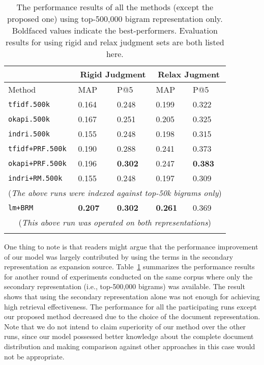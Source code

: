 \begin{table}[ht!]
  \centering
  \begin{tabular}{p{3cm}p{1.5cm}p{1.5cm}p{1.5cm}p{1.5cm}}
    & \multicolumn{2}{c}{Rigid Judgment} & \multicolumn{2}{c}{Relax Jugment} \\
    \hline
    Method & MAP & P@5 & MAP & P@5 \\
    \hline
    {\tt tfidf.500k} & 0.164 & 0.248 & 0.199 & 0.322 \\
    {\tt okapi.500k} & 0.167 & 0.251 & 0.205 & 0.325 \\
    {\tt indri.500k} & 0.155 & 0.248 & 0.198 & 0.315 \\
    {\tt tfidf+PRF.500k} & 0.190 & 0.288 & 0.241 & 0.373 \\
    {\tt okapi+PRF.500k} & 0.196 & {\bf 0.302} & 0.247 & {\bf 0.383} \\
    {\tt indri+RM.500k} & 0.155 & 0.248 & 0.197 & 0.309 \\
    \multicolumn{5}{c}{({\it The above runs were indexed against top-50k bigrams only})} \\
    \hline
    {\tt lm+BRM} & {\bf 0.207} & {\bf 0.302} & {\bf 0.261} & 0.369 \\
    \multicolumn{5}{c}{({\it This above run was operated on both representations})} \\
    \\
  \end{tabular}
  \caption{The performance results of all the methods (except the proposed one)
  using top-500,000 bigram representation only.  Boldfaced values indicate the
  best-performers.  Evaluation results for using rigid and relax judgment sets
  are both listed here.} \label{t:retrieval.500k}
\end{table}

One thing to note is that readers might argue that the performance improvement
of our model was largely contributed by using the terms in the secondary
representation as expansion source.  Table~\ref{t:retrieval.500k} summarizes
the performance results for another round of experiments conducted on the same
corpus where only the secondary representation (i.e., top-500,000 bigrams) was
available.  The result shows that using the secondary representation alone was
not enough for achieving high retrieval effectiveness.  The performance for all
the participating runs except our proposed method decreased due to the choice
of the document representation.  Note that we do not intend to claim
superiority of our method over the other runs, since our model possessed better
knowledge about the complete document distribution and making comparison
against other approaches in this case would not be appropriate.

